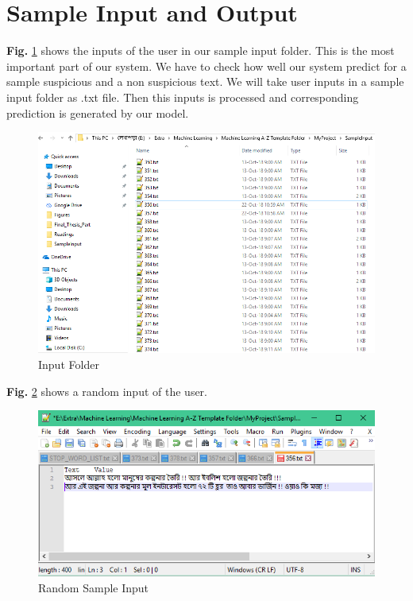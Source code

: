 \section{Sample Input and Output}
\textbf{Fig.} \ref{fig:smi} shows the inputs of the user in our sample input folder. This is the most important part of our system. We have to check how well our system predict for a sample suspicious and a non suspicious text. We will take user inputs in a sample input folder as .txt file. Then this inputs is processed and corresponding prediction is generated by our model.\par\vspace{0.5cm}
\begin{figure}[h!]
    \centering
    \includegraphics[scale=0.65]{Figures/sample_inp.PNG}
    \caption{Input Folder}
    \label{fig:smi}
\end{figure}
\par\noindent
\vspace{0.3cm}
\textbf{Fig.} \ref{fig:ui} shows a random input of the user.
\begin{figure}[h!]
    \centering
    \includegraphics[scale=0.7]{Figures/input_s.PNG}
    \caption{Random Sample Input}
    \label{fig:ui}
\end{figure}
